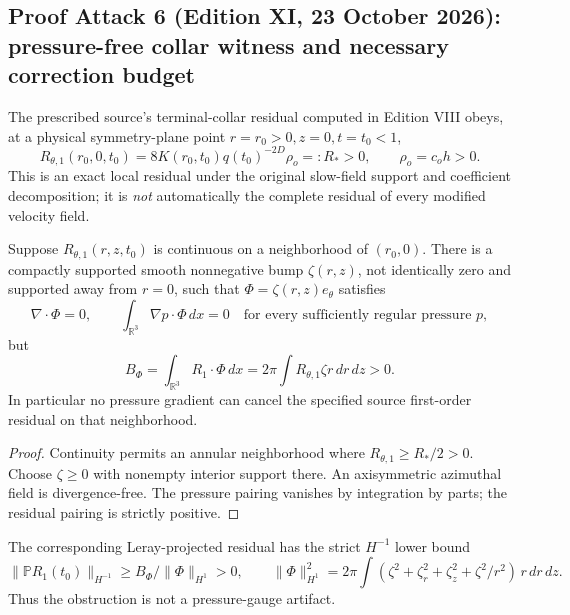 \subsection*{Proof Attack 6 (Edition XI, 23 October 2026): pressure-free collar witness and necessary correction budget}
\label{subsec:n1-pressure-free-dual-witness-XI}
The prescribed source's terminal-collar residual computed in Edition VIII
obeys, at a physical symmetry-plane point $r=r_0>0,z=0,t=t_0<1$,
\[
R_{\theta,1}(r_0,0,t_0)
=8K(r_0,t_0)q(t_0)^{-2D}\rho_o=:R_*>0,
\qquad \rho_o=c_oh>0.
\]
This is an exact local residual under the original slow-field
support and coefficient decomposition; it is \emph{not} automatically
the complete residual of every modified velocity field.

\begin{proposition}
Suppose $R_{\theta,1}(r,z,t_0)$ is continuous on a neighborhood of
$(r_0,0)$. There is a compactly supported smooth
nonnegative bump $\zeta(r,z)$, not identically zero and supported
away from $r=0$, such that $\Phi=\zeta(r,z)e_\theta$ satisfies
\[
\nabla\cdot\Phi=0,\qquad
\int_{\mathbb R^3}\nabla p\cdot\Phi\,dx=0
\quad\text{for every sufficiently regular pressure }p,
\]
but
\begin{equation}\label{eq:XI-positive-pairing}
B_\Phi=\int_{\mathbb R^3}R_1\cdot\Phi\,dx
=2\pi\int R_{\theta,1}\zeta r\,dr\,dz>0.
\end{equation}
In particular no pressure gradient can cancel the specified
source first-order residual on that neighborhood.
\end{proposition}
\begin{proof}
Continuity permits an annular neighborhood where
$R_{\theta,1}\ge R_*/2>0$. Choose $\zeta\ge0$ with
nonempty interior support there. An axisymmetric azimuthal field
is divergence-free. The pressure pairing vanishes by integration
by parts; the residual pairing is strictly positive.
\end{proof}
The corresponding Leray-projected residual has the strict
$H^{-1}$ lower bound
\[
\|\mathbb P R_1(t_0)\|_{H^{-1}}
\ge B_\Phi/\|\Phi\|_{H^1}>0,\qquad
\|\Phi\|_{H^1}^2=2\pi\int
(\zeta^2+\zeta_r^2+\zeta_z^2+\zeta^2/r^2)\,r\,dr\,dz.
\]
Thus the obstruction is not a pressure-gauge artifact.

